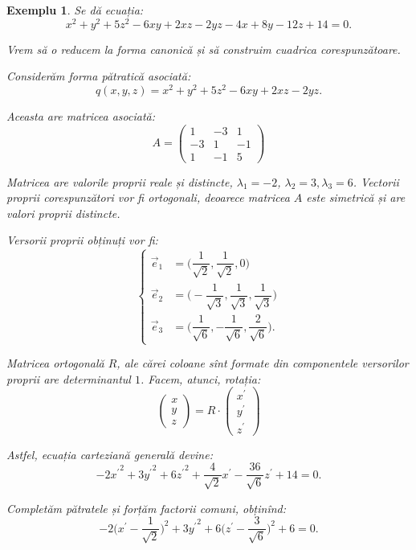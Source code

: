 \documentclass[11pt,a4paper]{article}
\theoremstyle{dotless}
\theoremstyle{dotlessdr}
\newtheorem{example}{Exemplu}[section]
\begin{document}
\begin{example}
	Se dă ecuația: 
 \[
	x^2 + y^2 + 5z^2 - 6xy + 2xz - 2yz - 4x + 8y - 12z + 14 = 0.
\]

Vrem să o reducem la forma canonică și să construim cuadrica corespunzătoare.

Considerăm forma pătratică asociată: 
 \[
	q(x, y, z) = x^2 + y^2 + 5z^2 - 6xy + 2xz - 2yz.
\]

Aceasta are matricea asociată: 
 \[
	A = \begin{pmatrix}
	        1 & -3 & 1 \\
	        -3 & 1 & -1 \\
	        1 & -1 & 5
        \end{pmatrix}
\]

Matricea are valorile proprii reale și distincte, $\lambda_1 = -2$,
$\lambda_2 = 3, \lambda_3 = 6$. Vectorii proprii corespunzători vor fi 
ortogonali, deoarece matricea $A$ este simetrică și are valori proprii 
distincte.

Versorii proprii obținuți vor fi: 
 \[
\begin{cases}
\vec{e}_1 &= \Big( \dfrac{1}{\sqrt{2}}, \dfrac{1}{\sqrt{2}}, 0 \Big) \\
\vec{e}_2 &= \Big( -\dfrac{1}{\sqrt{3}}, \dfrac{1}{\sqrt{3}},
                    \dfrac{1}{\sqrt{3}} \Big) \\
\vec{e}_3 &= \Big( \dfrac{1}{\sqrt{6}}, - \dfrac{1}{\sqrt{6}},
                \dfrac{2}{\sqrt{6}} \Big).
\end{cases}
\]

Matricea ortogonală $R$, ale cărei coloane sînt formate din componentele
versorilor proprii are determinantul $1$. Facem, atunci, rotația: 
 \[
	\begin{pmatrix}
	    x \\ y \\ z
    \end{pmatrix} = R \cdot \begin{pmatrix}
	                            x^{\prime} \\ y^{\prime} \\ z^{\prime}
                            \end{pmatrix}
\]

Astfel, ecuația carteziană generală devine: 
 \[
	-2{x^{\prime}}^2 + 3 {y^{\prime}}^2 + 6 {z^{\prime}}^2 +
	\dfrac{4}{\sqrt{2}} x^{\prime} - \dfrac{36}{\sqrt{6}}z^{\prime} + 14 = 0.
\]

Completăm pătratele și forțăm factorii comuni, obținînd: 
 \[
	-2 \Big( x^{\prime} - \dfrac{1}{\sqrt{2}} \Big)^2 + 3 {y^{\prime}}^2 + 
	6 \Big( z^{\prime} - \dfrac{3}{\sqrt{6}} \Big)^2 + 6 = 0.
\]


\end{example}
\end{document}
